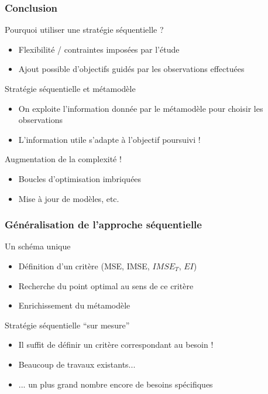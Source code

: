 \begin{frame}
\frametitle{Conclusion}
\begin{block}{Pourquoi utiliser une stratégie séquentielle ?}
\begin{itemize}
 \item Flexibilité / contraintes imposées par l'étude
 \item Ajout possible d'objectifs guidés par les observations effectuées
\end{itemize}
\end{block}

\begin{exampleblock}{Stratégie séquentielle et métamodèle}
\begin{itemize}
 \item On exploite l'information donnée par le métamodèle pour choisir les observations
 \item L'information utile s'adapte à l'objectif poursuivi !
\end{itemize}
\end{exampleblock}

\begin{alertblock}{Augmentation de la complexité !}
\begin{itemize}
 \item Boucles d'optimisation imbriquées
 \item Mise à jour de modèles, etc.
\end{itemize}
\end{alertblock}

\end{frame}
\begin{frame}
\frametitle{Généralisation de l'approche séquentielle}
\begin{block}{Un schéma unique}
\begin{itemize}
 \item Définition d'un critère (MSE, IMSE, $IMSE_T$, $EI$)
 \item Recherche du point optimal au sens de ce critère
 \item Enrichissement du métamodèle
\end{itemize}
\end{block}

\begin{exampleblock}{Stratégie séquentielle ``sur mesure''}
\begin{itemize}
 \item Il suffit de définir un critère correspondant au besoin !
 \item Beaucoup de travaux existants...
 \item ... un plus grand nombre encore de besoins spécifiques 
\end{itemize}
\end{exampleblock}
\end{frame}
